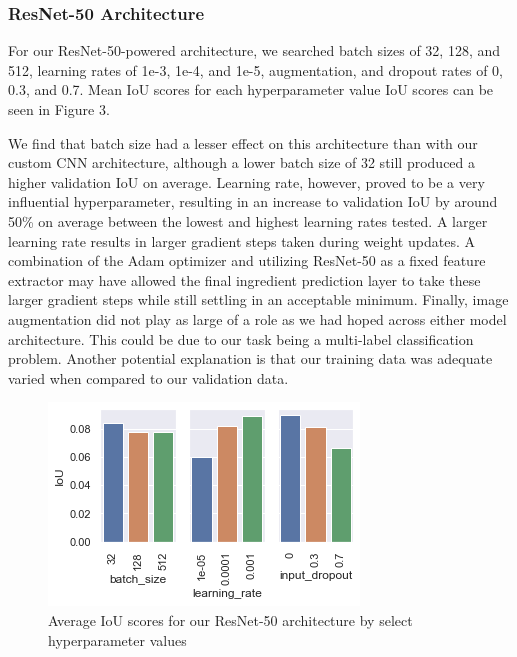 \documentclass[10pt,twocolumn,letterpaper]{article}
\begin{document}
\subsubsection{ResNet-50 Architecture}
For our ResNet-50-powered architecture, we searched batch sizes of 32, 128, and 512, learning rates of 1e-3, 1e-4, and 1e-5, augmentation, and dropout rates of 0, 0.3, and 0.7. Mean IoU scores for each hyperparameter value IoU scores can be seen in Figure 3.

We find that batch size had a lesser effect on this architecture than with our custom CNN architecture, although a lower batch size of 32 still produced a higher validation IoU on average. Learning rate, however, proved to be a very influential hyperparameter, resulting in an increase to validation IoU by around 50\% on average between the lowest and highest learning rates tested. A larger learning rate results in larger gradient steps taken during weight updates. A combination of the Adam optimizer and utilizing ResNet-50 as a fixed feature extractor may have allowed the final ingredient prediction layer to take these larger gradient steps while still settling in an acceptable minimum. Finally, image augmentation did not play as large of a role as we had hoped across either model architecture. This could be due to our task being a multi-label classification problem. Another potential explanation is that our training data was adequate varied when compared to our validation data.

\begin{figure}[t]
\begin{center}
   \includegraphics[width=0.8\linewidth]{resnet-iou-params.png}
\end{center}
\caption{Average IoU scores for our ResNet-50 architecture by select hyperparameter values}
\label{fig:onecol}
\end{figure}
\end{document}
